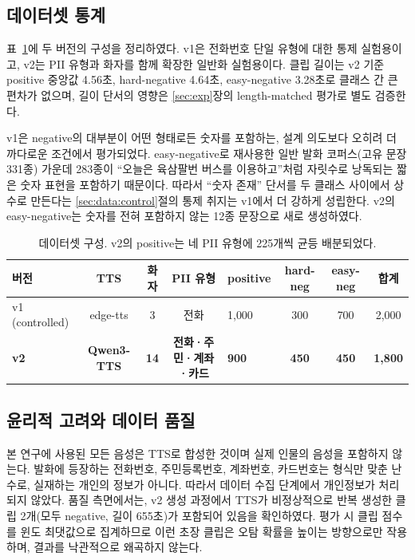 \documentclass[11pt]{article}
\begin{document}
\subsection{데이터셋 통계}
표~\ref{tab:dataset}에 두 버전의 구성을 정리하였다. v1은 전화번호 단일 유형에 대한 통제
실험용이고, v2는 PII 유형과 화자를 함께 확장한 일반화 실험용이다. 클립 길이는 v2 기준
positive 중앙값 4.56초, hard-negative 4.64초, easy-negative 3.28초로 클래스 간 큰 편차가
없으며, 길이 단서의 영향은 \ref{sec:exp}장의 length-matched 평가로 별도 검증한다.

v1은 negative의 대부분이 어떤 형태로든 숫자를 포함하는, 설계 의도보다 오히려 더 까다로운
조건에서 평가되었다. easy-negative로 재사용한 일반 발화 코퍼스(고유 문장 331종) 가운데
283종이 ``오늘은 육삼팔번 버스를 이용하고''처럼 자릿수로 낭독되는 짧은 숫자 표현을 포함하기
때문이다. 따라서 ``숫자 존재'' 단서를 두 클래스 사이에서 상수로 만든다는
\ref{sec:data:control}절의 통제 취지는 v1에서 더 강하게 성립한다. v2의 easy-negative는
숫자를 전혀 포함하지 않는 12종 문장으로 새로 생성하였다.

\begin{table}[!htbp]
\centering
\caption{데이터셋 구성. v2의 positive는 네 PII 유형에 225개씩 균등 배분되었다.}
\label{tab:dataset}
\small
\setlength{\tabcolsep}{4pt}
\begin{tabular}{lccclccc}
\toprule
버전 & TTS & 화자 & PII 유형 & positive & hard-neg & easy-neg & 합계 \\
\midrule
v1 (controlled) & edge-tts & 3 & 전화 & 1{,}000 & 300 & 700 & 2{,}000 \\
\textbf{v2} & \textbf{Qwen3-TTS} & \textbf{14} & \textbf{전화·주민·계좌·카드} & \textbf{900} & \textbf{450} & \textbf{450} & \textbf{1{,}800} \\
\bottomrule
\end{tabular}
\end{table}

\subsection{윤리적 고려와 데이터 품질}
본 연구에 사용된 모든 음성은 TTS로 합성한 것이며 실제 인물의 음성을 포함하지 않는다.
발화에 등장하는 전화번호, 주민등록번호, 계좌번호, 카드번호는 형식만 맞춘 난수로,
실재하는 개인의 정보가 아니다. 따라서 데이터 수집 단계에서 개인정보가 처리되지 않았다.
품질 측면에서는, v2 생성 과정에서 TTS가 비정상적으로 반복 생성한 클립 2개(모두 negative,
길이 655초)가 포함되어 있음을 확인하였다. 평가 시 클립 점수를 윈도 최댓값으로 집계하므로
이런 초장 클립은 오탐 확률을 높이는 방향으로만 작용하며, 결과를 낙관적으로 왜곡하지
않는다.
\end{document}
